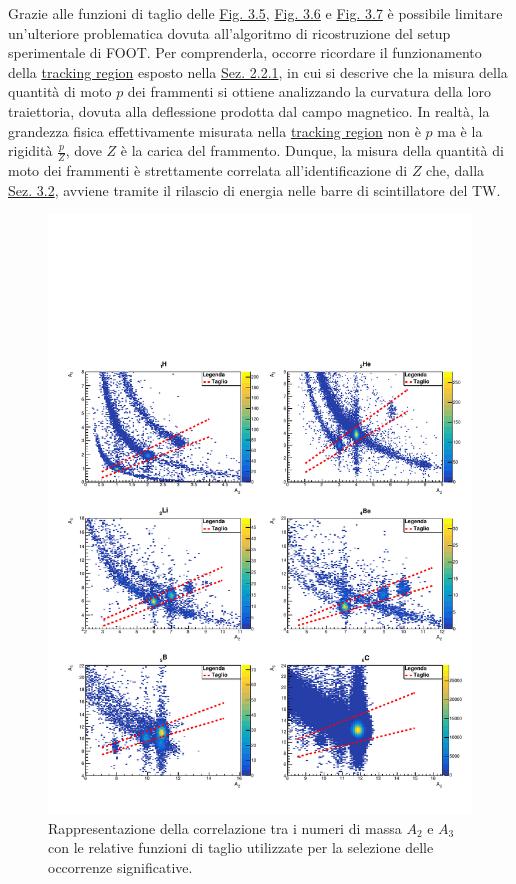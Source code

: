 \documentclass[12pt,a4paper,twoside]{report}
\begin{document}
	Grazie alle funzioni di taglio delle \hyperref[fig:a1_cut]{Fig. 3.5}, \hyperref[fig:a2_cut]{Fig. 3.6} e \hyperref[fig:a3_cut]{Fig. 3.7} è possibile limitare un'ulteriore problematica dovuta all'algoritmo di ricostruzione del setup sperimentale di FOOT. Per comprenderla, occorre ricordare il funzionamento della \hyperref[par:tracking_region]{tracking region} esposto nella \hyperref[sec:setupElettronico]{Sez. 2.2.1}, in cui si descrive che la misura della quantità di moto $p$ dei frammenti si ottiene analizzando la curvatura della loro traiettoria, dovuta alla deflessione prodotta dal campo magnetico. In realtà, la grandezza fisica effettivamente misurata nella \hyperref[par:tracking_region]{tracking region} non è $p$ ma è la rigidità $\frac{p}{Z}$, dove $Z$ è la carica del frammento. Dunque, la misura della quantità di moto dei frammenti è strettamente correlata all'identificazione di $Z$ che, dalla \hyperref[sec:atomic_number_identification]{Sez. 3.2}, avviene tramite il rilascio di energia nelle barre di scintillatore del TW.
	\begin{figure}[H]
		\centering
		\includegraphics[width=.95\linewidth]{c_MultiCanvasCut3.pdf}
		\caption{Rappresentazione della correlazione tra i numeri di massa $A_2$ e $A_3$ con le relative funzioni di taglio utilizzate per la selezione delle occorrenze significative.}
		\label{fig:a3_cut}
	\end{figure}
\end{document}
